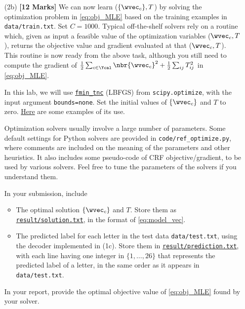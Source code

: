 \documentclass[11pt]{report}
\begin{document}
\begin{itemize}
	{\bf Provide} the value of $\frac{1}{n} \sum_{t=1}^n \log p(\yvec^t | X^t)$ for this case in your report.
	
	For your reference,
	in your instructor's Python implementation,
	it takes 5 seconds to compute the gradient on the whole training set.
	Single core of Intel(R) i7-10510U CPU @ 1.80GHz.
	
    {\bf [Answers. 2 a)]} 
	 \begin{itemize}
        \item $\frac{1}{n} \sum_{i=1}^n \log p(\yvec^t | X^t) = -31.790005021589167 $
    \end{itemize}
	\item[(2b)] {\bf [12 Marks]} We can now learn ($\{\wvec_c\}, T$) by solving the optimization problem in \eqref{eq:obj_MLE} based on the training examples in \verb#data/train.txt#.
	Set $C = 1000$.
	Typical off-the-shelf solvers rely on a routine which, given as input a feasible value of the optimization variables ($\wvec_c, T$), returns the objective value and gradient evaluated at that ($\wvec_c, T$). This routine is now ready from the above task,
	although you still need to compute the gradient of $\frac{1}{2} \sum_{c \in \Ycal} \nbr{\wvec_c}^2 + \frac{1}{2} \sum_{ij} T^2_{ij}$ in \eqref{eq:obj_MLE}.
	
	In this lab, we will use \href{https://docs.scipy.org/doc/scipy/reference/generated/scipy.optimize.fmin_tnc.html}{\texttt{fmin\_tnc}} (LBFGS) from \verb#scipy.optimize#, with the input argument \verb#bounds=none#.	
	Set the initial values of $\{\wvec_c\}$ and $T$ to zero.
	\href{https://www.programcreek.com/python/example/114546/scipy.optimize.fmin_tnc}{Here} are some examples of its use.
	
	Optimization solvers usually involve a large number of parameters.
	Some default settings for Python solvers are provided in \verb#code/ref_optimize.py#,
	where comments are included on the meaning of the parameters and other heuristics.
	It also includes some pseudo-code of CRF objective/gradient,
	to be used by various solvers.
	Feel free to tune the parameters of the solvers if you understand them.
	
	In your submission, include
	\begin{itemize}
		\item The optimal solution $\{\wvec_c\}$ and $T$.  Store them as \underline{\tt{result/solution.txt}}, in the format of \eqref{eq:model_vec}.
		\item The predicted label for each letter in the test data \verb#data/test.txt#, using the decoder implemented in (1c).
		Store them in \underline{\tt{result/prediction.txt}},
		with each line having one integer in $\{1,\ldots, 26\}$ that represents the predicted label of a letter, in the same order as it appears in \verb#data/test.txt#.
	\end{itemize}
	In your report, provide the optimal objective value of \eqref{eq:obj_MLE} found by your solver.
    

\end{itemize}
\end{document}
